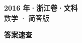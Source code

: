 \documentclass[zihao=-4, a4paper]{ctexart}
\begin{document}
\begin{center}
  {\Large\bfseries 2016 年·浙江卷·文科}\\[4pt]
  {\large 数学 · 简答版}
\end{center}
\medskip
{}

\clearpage
{}
\begin{center}{\Large\bfseries 答案速查}\end{center}
\medskip

\end{document}
